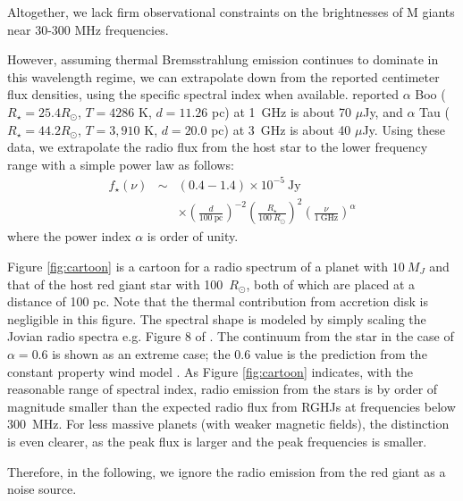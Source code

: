 \documentclass[iop,numberedappendix,apj]{emulateapj}
\begin{document}
Altogether, we lack firm observational constraints on the brightnesses of M giants near %
30-300 MHz frequencies. 

However, assuming thermal Bremsstrahlung emission continues to dominate in this wavelength regime, we can extrapolate down from the reported centimeter flux densities, using the specific spectral index when available. 
%
\citet{OGorman2013} reported $\alpha $ Boo ($R_\star = 25.4 R_{\odot }$, $T=4286$ K, $d=11.26$ pc) at 1~GHz is about 70 $\mu$Jy, and $\alpha $ Tau ($R_\star = 44.2  R_{\odot }$, $T=3,910$ K, $d=20.0$ pc) at 3~GHz is about 40 $\mu$Jy. 
Using these data, we extrapolate the radio flux from the host star to the lower frequency range with a simple power law as follows:
\begin{eqnarray}
\nonumber f_{\star }(\nu ) &\sim & (0.4-1.4) \times 10^{-5} ~\mbox{Jy} \\
&& \times \left( \frac{d}{100 ~\mbox{pc}} \right)^{-2}  \left( \frac{R_{\star }}{100 ~R_{\odot }} \right)^2 \left( \frac{\nu}{1~\mbox{GHz}} \right)^{\alpha } 
\end{eqnarray}
where the power index $\alpha $ is order of unity. 

Figure \ref{fig:cartoon} is a cartoon for a radio spectrum of a planet with $10~M_J$ and that of the host red giant star with 100~$R_{\odot }$, both of which are placed at a distance of 100 pc. 
Note that the thermal contribution from accretion disk is negligible in this figure. 
The spectral shape is modeled by simply scaling the Jovian radio spectra e.g. Figure 8 of \citet{zarka_et_al2004}. 
The continuum from the star in the case of $\alpha =0.6$ is shown as an extreme case; the 0.6 value is the prediction from the constant property wind model \citep{wright1975,panagia1975,olnon1975}. 
As Figure \ref{fig:cartoon} indicates, with the reasonable range of spectral index, radio emission from the stars is by order of magnitude smaller than the expected radio flux from RGHJs at frequencies below 300~MHz. 
For less massive planets (with weaker magnetic fields), the distinction is even clearer, as the peak flux is larger and the peak frequencies is smaller. 


Therefore, in the following, we ignore the radio emission from the red giant as a noise source. 
\end{document}
